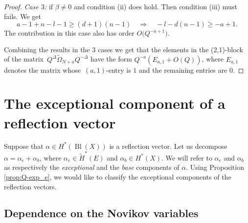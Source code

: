 \documentclass[10pt,a4paper]{article}
\numberwithin{equation}{section}
\begin{document}
\begin{proof}
{\em Case $3$:} if $\beta\neq 0$ and condition (ii) does hold. Then
condition (iii) must fails. We get
\[
a-1+n-l-1\geq (d+1)(n-1)\quad \Rightarrow\quad
-l-d(n-1) \geq -a+1.
\]
The contribution in this case also has order $O\big(Q^{-a+1}\big)$.

Combining the results in the 3 cases we get that the elements in the
(2,1)-block of the matrix~${Q^\Delta \widetilde{\Omega}_{N+a}
Q^{-\Delta}}$ have the form $Q^{-a} (E_{a,1} +O(Q))$, where $E_{a,1}$
denotes the matrix whose~$(a,1)$-entry is $1$ and the remaining
entries are $0$.
\end{proof}

\section{The exceptional component of a reflection vector}
\label{sec:qexp_mon}

Suppose that $\alpha \in  H^* (\operatorname{Bl}(X))$ is a reflection vector. Let us decompose $\alpha=\alpha_e+\alpha_b$, where ${\alpha_e \in  \widetilde{H}^* (E)}$ and $\alpha_b\in H^*(X)$. We will refer to $\alpha_e$ and $\alpha_b$ as respectively the {\em exceptional} and the {\em base} components of $\alpha$. Using Proposition \ref{prop:Q-exp_e}, we would like to classify the exceptional components of the reflection vectors.

\subsection{Dependence on the Novikov variables}
\label{sec:rv_qdep}
\end{document}
